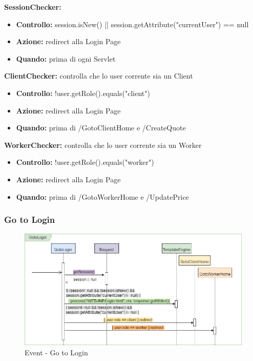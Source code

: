\documentclass[a4paper, 12pt]{article}
\begin{document}
\noindent \textbf{SessionChecker:}
\begin{itemize}
\item \textbf{Controllo:} session.isNew() || session.getAttribute("currentUser") == null 
\item \textbf{Azione:} redirect alla Login Page
\item \textbf{Quando:} prima di ogni Servlet
\end{itemize}
\textbf{ClientChecker:} controlla che lo user corrente sia un Client
\begin{itemize}
\item \textbf{Controllo:} !user.getRole().equals("client")
\item \textbf{Azione:} redirect alla Login Page
\item \textbf{Quando:} prima di /GotoClientHome e /CreateQuote
\end{itemize}
\textbf{WorkerChecker:} controlla che lo user corrente sia un Worker
\begin{itemize}
\item \textbf{Controllo:} !user.getRole().equals("worker")
\item \textbf{Azione:} redirect alla Login Page
\item \textbf{Quando:} prima di /GotoWorkerHome e /UpdatePrice
\end{itemize}
\newpage
\subsubsection{Go to Login}
\begin{figure}[h!]
	\centering
	\includegraphics[width=1\textwidth]{PureHTML_images/GotoLogin.png}
	\caption{Event - Go to Login}
	\label{figure:gotologin_sd}
\end{figure}
\end{document}
